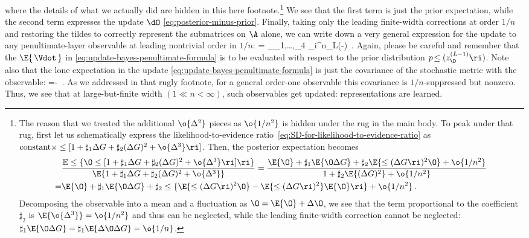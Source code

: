 where the details of what we actually did are hidden in this here footnote.\footnote{The reason that we treated the additional $\o{\Delta^2}$ pieces as $\o{1/n^2}$ is hidden under the rug in the main body. To peak under that rug, first let us schematically express the likelihood-to-evidence ratio~\eqref{eq:SD-for-likelihood-to-evidence-ratio} as $\text{constant}\times \le[1+\sharp_1\Delta G+\sharp_2 (\Delta G)^2+\o{\Delta^3}\ri]$. Then, the posterior expectation becomes
\begin{align}
&\frac{\mathbb{E}\le\{\O \le[1+\sharp_1\Delta G+\sharp_2 (\Delta G)^2+\o{\Delta^3}\ri]\ri\}}{\E{1+\sharp_1\Delta G+\sharp_2 (\Delta G)^2+\o{\Delta^3}}}=\frac{\E{\O}+\sharp_1\E{\O\Delta G}+\sharp_2\E{\le(\Delta G\ri)^2\O}+\o{1/n^2}}{1+\sharp_2 \E{(\Delta G)^2}+\o{1/n^2}}\, \\
=&\E{\O}+\sharp_1\E{\O \Delta G}+\sharp_2 \le\{\E{\le(\Delta G\ri)^2\O}-\E{\le(\Delta G\ri)^2}\E{\O}\ri\}+\o{1/n^2}\, .\notag
\end{align}
Decomposing the observable into a mean and a fluctuation as $\O=\E{\O}+\Delta \O$, we see that the term proportional to the coefficient $\sharp_2$ is $\E{\o{\Delta^3}}=\o{1/n^2}$ and thus can be neglected, while the leading finite-width correction cannot be neglected: $\sharp_1\E{\O \Delta G}=\sharp_1\E{\Delta\O \Delta G}=\o{1/n}$.
} We see that the first term is just the prior expectation, while the second term expresses the update $\dO$ \eqref{eq:posterior-minus-prior}.
Finally, 
taking only the leading finite-width corrections at order $1/n$ and 
restoring the tildes to correctly represent the submatrices on $\A$ alone, we can write down a very general expression for the update to any penultimate-layer observable at leading nontrivial order in $1/n$:
\be\label{eq:update-bayes-penultimate-formula}
\dO = \sum_{\tra_1,\ldots,\tra_4\in\A} \sum_{i}^{n_L}\le(\!-\!\ri)\, . %
\ee
Again, please be careful and remember that the $\E{\,\Vdot\,}$ in \eqref{eq:update-bayes-penultimate-formula} is to be evaluated with respect to the prior distribution $p\!\le(z_{\D}^{(L-1)} \ri)$.
Note also that the lone expectation in the update \eqref{eq:update-bayes-penultimate-formula} is just the covariance of the stochastic metric with the observable:
\be
{}=-\, .
\ee
As we addressed in that rugly footnote, for a general order-one observable this covariance is $1/n$-suppressed but nonzero. Thus, we see that at large-but-finite width $(1 \ll n < \infty)$, such observables get updated: representations are learned.






